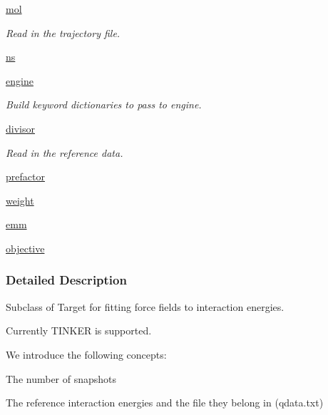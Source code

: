 \begin{DoxyCompactItemize}
\item 
\hyperlink{classsrc_1_1interaction_1_1Interaction_a3607dc785b20dfb46c141137294cfd41}{mol}
\begin{DoxyCompactList}\small\item\em Read in the trajectory file. \end{DoxyCompactList}\item 
\hyperlink{classsrc_1_1interaction_1_1Interaction_a9614d9622c80c11805de5223e4f2696a}{ns}
\item 
\hyperlink{classsrc_1_1interaction_1_1Interaction_acdf911ff3c6697b959bc5edcff67035b}{engine}
\begin{DoxyCompactList}\small\item\em Build keyword dictionaries to pass to engine. \end{DoxyCompactList}\item 
\hyperlink{classsrc_1_1interaction_1_1Interaction_a98cbd2bf41947df173b9e68cfb22f843}{divisor}
\begin{DoxyCompactList}\small\item\em Read in the reference data. \end{DoxyCompactList}\item 
\hyperlink{classsrc_1_1interaction_1_1Interaction_a1e607cf9aea355210083401b2dd0fc84}{prefactor}
\item 
\hyperlink{classsrc_1_1interaction_1_1Interaction_abd8c04a4e99808c9d5eb728e9a56debe}{weight}
\item 
\hyperlink{classsrc_1_1interaction_1_1Interaction_ab5614c9829933a5297efc2a895f8a7a7}{emm}
\item 
\hyperlink{classsrc_1_1interaction_1_1Interaction_affa79ef8ca4ec5a13bb925578356aacc}{objective}
\end{DoxyCompactItemize}


\subsubsection{Detailed Description}
Subclass of Target for fitting force fields to interaction energies. 

Currently T\+I\+N\+K\+ER is supported.

We introduce the following concepts\+:
\begin{DoxyItemize}
\item The number of snapshots
\item The reference interaction energies and the file they belong in (qdata.\+txt)
\end{DoxyItemize}

